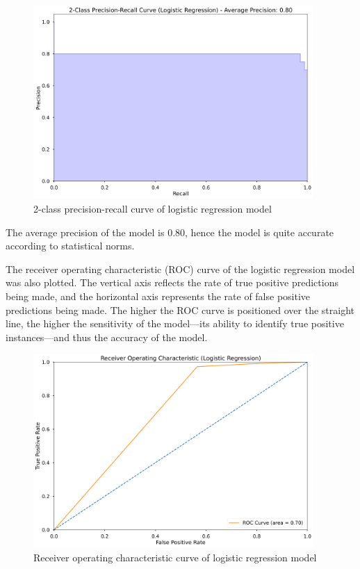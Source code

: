 \documentclass[12pt,bibliography=totocnumbered]{scrartcl}
\begin{document}
{\begin{figure}[htpb]
	\begin{center}
		\includegraphics[width=0.95\textwidth]{../results/rq3/prec-recall_logreg.png}
	\end{center}
	\caption{2-class precision-recall curve of logistic regression model}
	\label{fig:lg-prcurve}
\end{figure}

The average precision of the model is $0.80$, hence the model is quite accurate
according to statistical norms.

The receiver operating characteristic (ROC) curve of the logistic regression model
was also plotted. The vertical axis reflects the rate of true positive predictions
being made, and the horizontal axis represents the rate of false positive predictions
being made. The higher the ROC curve is positioned over the straight line, the higher
the sensitivity of the model---its ability to identify true positive instances---and
thus the accuracy of the model.

\begin{figure}[htpb]
	\begin{center}
		\includegraphics[width=0.95\textwidth]{../results/rq3/roc_logreg.png}
	\end{center}
	\caption{Receiver operating characteristic curve of logistic regression model}
	\label{fig:lg-roc}
\end{figure}

}
\end{document}
